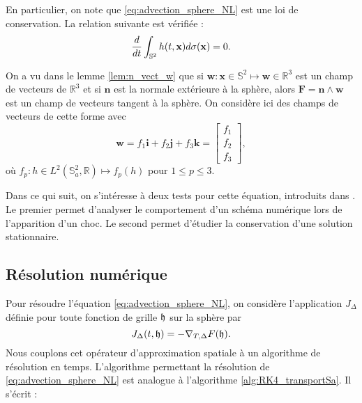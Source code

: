 En particulier, on note que \eqref{eq:advection_sphere_NL} est une loi de conservation. La relation suivante est vérifiée :
\begin{equation}
\dfrac{d}{dt} \displaystyle\int_{\mathbb{S}^2} h(t,\mathbf{x}) d \sigma(\mathbf{x}) = 0.
\end{equation}

On a vu dans le lemme \ref{lem:n_vect_w} que si $\mathbf{w} : \mathbf{x} \in \mathbb{S}^2 \mapsto \mathbf{w} \in \mathbb{R}^3$ est un champ de vecteurs de $\mathbb{R}^3$ et si $\mathbf{n}$ est la normale extérieure à la sphère, alors $\mathbf{F} = \mathbf{n} \wedge \mathbf{w}$ est un champ de vecteurs tangent à la sphère. On considère ici des champs de vecteurs de cette forme avec 
\begin{equation}
\mathbf{w} = f_1 \mathbf{i} + f_2 \mathbf{j}+ f_3 \mathbf{k} = \begin{bmatrix}
f_1 \\ f_2 \\ f_3
\end{bmatrix},
\end{equation}
où $f_p : h \in L^2(\mathbb{S}_a^2, \mathbb{R}) \mapsto f_p(h)$  pour $1 \leq p \leq 3$.


Dans ce qui suit, on s'intéresse à deux tests pour cette équation, introduits dans \cite{BenArtzi2009}. Le premier permet d'analyser le comportement d'un schéma numérique lors de l'apparition d'un choc. Le second permet d'étudier la conservation d'une solution stationnaire.










\subsection{Résolution numérique}

Pour résoudre l'équation \eqref{eq:advection_sphere_NL}, on considère l'application $J_{\Delta}$ définie pour toute fonction de grille $\mathfrak{h}$ sur la sphère par
\begin{equation}
J_{\Delta}(t,\mathfrak{h}) = - \nabla_{T,\Delta} F(\mathfrak{h}).
\end{equation}
Nous couplons cet opérateur d'approximation spatiale à un algorithme de résolution en temps. L'algorithme permettant la résolution de \eqref{eq:advection_sphere_NL} est analogue à l'algorithme \ref{alg:RK4_transportSa}. Il s'écrit :

